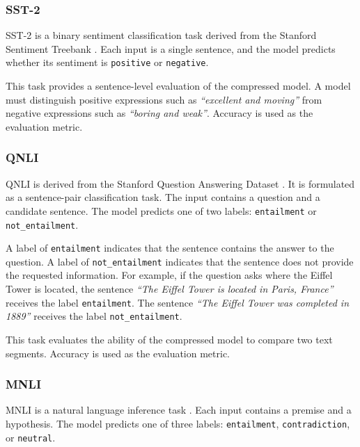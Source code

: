 \subsubsection{SST-2}
\label{subsubsec:sst2}

SST-2 is a binary sentiment classification task derived from the Stanford Sentiment Treebank \citep{socher2013recursive}. Each input is a single sentence, and the model predicts whether its sentiment is \texttt{positive} or \texttt{negative}.

This task provides a sentence-level evaluation of the compressed model. A model must distinguish positive expressions such as \textit{``excellent and moving''} from negative expressions such as \textit{``boring and weak''}. Accuracy is used as the evaluation metric.

\subsubsection{QNLI}
\label{subsubsec:qnli}

QNLI is derived from the Stanford Question Answering Dataset \citep{rajpurkar2016squad}. It is formulated as a sentence-pair classification task. The input contains a question and a candidate sentence. The model predicts one of two labels: \texttt{entailment} or \texttt{not\_entailment}.

A label of \texttt{entailment} indicates that the sentence contains the answer to the question. A label of \texttt{not\_entailment} indicates that the sentence does not provide the requested information. For example, if the question asks where the Eiffel Tower is located, the sentence \textit{``The Eiffel Tower is located in Paris, France''} receives the label \texttt{entailment}. The sentence \textit{``The Eiffel Tower was completed in 1889''} receives the label \texttt{not\_entailment}.

This task evaluates the ability of the compressed model to compare two text segments. Accuracy is used as the evaluation metric.

\subsubsection{MNLI}
\label{subsubsec:mnli}

MNLI is a natural language inference task \citep{williams2018broad}. Each input contains a premise and a hypothesis. The model predicts one of three labels: \texttt{entailment}, \texttt{contradiction}, or \texttt{neutral}.

